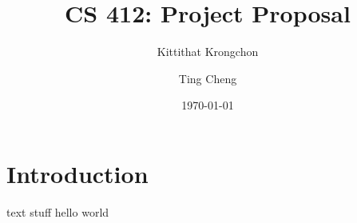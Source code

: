 \documentclass[onecolumn,aps,pra,floatfix,nolongbibliography,11pt]{revtex4-2}
\begin{document}
\title{CS 412: Project Proposal}
\author{Kittithat Krongchon}
\author{Ting Cheng}
\date{\today}

\maketitle


\section{Introduction}

text stuff
hello world
\end{document}
